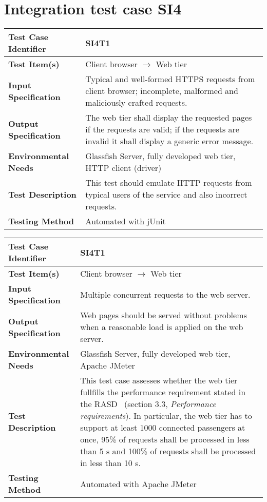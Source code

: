 \vspace{2em}

\section{Integration test case SI4}

\begin{tabular}{l p{}}
    \hline
    \textbf{Test Case Identifier} & SI4T1\\
    \hline
    \textbf{Test Item(s)} & Client browser $\rightarrow$ Web tier\\
    \hline
    \textbf{Input Specification} & Typical and well-formed HTTPS requests from client browser; incomplete, malformed and maliciously crafted requests.\\
    \hline
    \textbf{Output Specification} & The web tier shall display the requested pages if the requests are valid; if the requests are invalid it shall display a generic error message. \\
    \hline
    \textbf{Environmental Needs} & Glassfish Server, fully developed web tier, HTTP client (driver)\\
    \hline
    \textbf{Test Description} & This test should emulate HTTP requests from typical users of the service and also incorrect requests.\\
    \hline
    \textbf{Testing Method} & Automated with jUnit \\
    \hline
\end{tabular}

\vspace{2em}

\noindent\begin{tabular}{l p{}}
    \hline
    \textbf{Test Case Identifier} & SI4T1\\
    \hline
    \textbf{Test Item(s)} & Client browser $\rightarrow$ Web tier\\
    \hline
    \textbf{Input Specification} & Multiple concurrent requests to the web server.\\
    \hline
    \textbf{Output Specification} & Web pages should be served without problems when a reasonable load is applied on the web server. \\
    \hline
    \textbf{Environmental Needs} & Glassfish Server, fully developed web tier, Apache JMeter\\
    \hline
    \textbf{Test Description} & This test case assesses whether the web tier fullfills the performance requirement stated in the RASD~\cite{mytaxi-rasd} (section 3.3, \emph{Performance requirements}). In particular, the web tier has to support at least 1000 connected passengers at once, 95\% of requests shall be processed in less than 5 s and 100\% of requests shall be processed in less than 10 s.\\
    \hline
    \textbf{Testing Method} & Automated with Apache JMeter \\
    \hline
\end{tabular}

